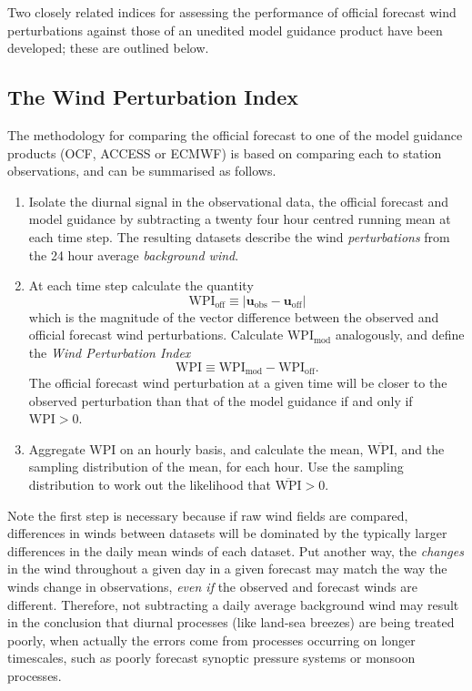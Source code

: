 \documentclass[12pt]{article}
\begin{document}
Two closely related indices for assessing the performance of official forecast wind perturbations against those of an unedited model guidance product have been developed; these are outlined below. 

\subsection{The Wind Perturbation Index}\label{daily-performance}
The methodology for comparing the official forecast to one of the model
guidance products (OCF, ACCESS or ECMWF) is based on comparing each to station
observations, and can be summarised as follows. 
\begin{enumerate}
\item
Isolate the diurnal signal in the observational data, the official forecast and model guidance by subtracting a twenty four hour centred running mean at each time step. The resulting datasets describe the wind \emph{perturbations} from the 24 hour average \emph{background wind}. 
\item
At each time step calculate the quantity
\begin{equation}
\text{WPI}_{\text{off}} \equiv \left\lvert \boldsymbol{u}_{\text{obs}}-\boldsymbol{u}_{\text{off}} \right\rvert 
\end{equation}
which is the magnitude of the vector difference between the observed and
official forecast wind perturbations. Calculate
\(\text{WPI}_{\text{mod}}\) analogously, and define the \emph{Wind
Perturbation Index}
\begin{equation}
\text{WPI} \equiv \text{WPI}_{\text{mod}} - \text{WPI}_{\text{off}}.
\end{equation}
The official forecast wind perturbation at a given time will be closer
to the observed perturbation than that of the model guidance if and only if \(\text{WPI} > 0\). 
\item
Aggregate \(\text{WPI}\) on an hourly basis, and calculate the mean, $\overline{\text{WPI}}$, and the sampling distribution of the mean, for each hour. Use the sampling distribution to work out the likelihood that $\overline{\text{WPI}} > 0$.    
\end{enumerate}

Note the first step is necessary because if raw wind fields are compared, differences in winds between datasets will be dominated by the typically larger differences in the daily mean winds of each dataset.
Put another way, the \emph{changes} in the wind throughout a given day in a given forecast may match the way the winds change in observations, \emph{even if} the observed and forecast winds are different. Therefore, not subtracting a daily average background wind may result in the conclusion that diurnal processes (like land-sea breezes) are being treated poorly, when actually the errors come from processes occurring on longer timescales, such as poorly forecast synoptic pressure systems or monsoon processes. 
\end{document}
